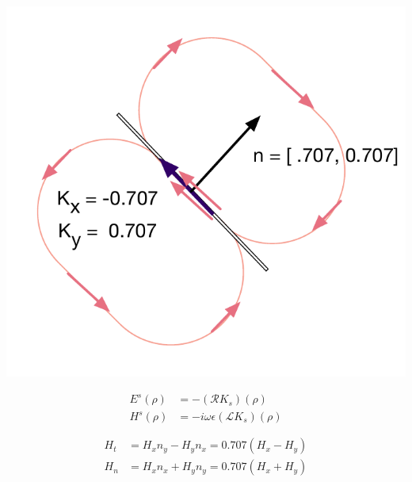 \documentclass{article}
\newcommand{\0}{\varnothing}
\begin{document}
\begin{minipage}{0.35\textwidth}
\begin{center}
\includegraphics[width=1\columnwidth]{figures/Seg45}
\end{center}
\end{minipage}
\begin{minipage}{0.5\textwidth}
\begin{align*}
    E^s(\rho) &= - (\mathcal{R}K_s)(\rho)\\
    H^s(\rho) &= -i\omega\epsilon(\mathcal{L}K_s)(\rho)\\ \\
 \end{align*}
 \begin{align*}
    H_t &= H_x n_y - H_y n_x = 0.707 (H_x-H_y)\\
    H_n &= H_x n_x + H_y n_y = 0.707 (H_x+H_y)
 \end{align*}
 \end{minipage}
\end{document}
